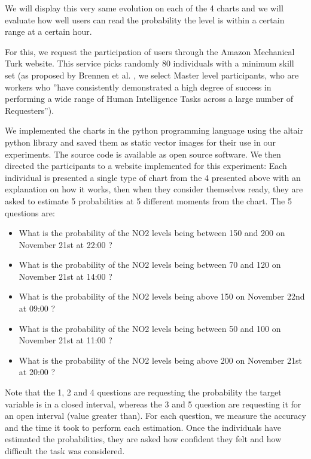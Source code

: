 \documentclass[a4paper,3p,sort&compress]{elsarticle}
\begin{document}
We will display this very same evolution on each of the 4 charts and we will evaluate how well users can 
read the probability the \no level is within a certain range at a certain hour. 

For this, we request the participation of users through the Amazon Mechanical Turk website. 
This service picks randomly 80 individuals with a minimum skill set (as proposed by Brennen 
et al. \cite{brennen_instrument_2018}, we select Master level participants, who are workers who 
''have consistently demonstrated a high degree of success in performing a wide range of Human Intelligence Tasks across a 
large number of Requesters'').

We implemented the charts in the python programming language using the altair python library 
\cite{vanderplas2018altair} and saved them as static vector images for their use in our experiments. The source code is 
available as open source software. We then directed the participants to a website implemented for this experiment: 
Each individual is presented a 
single type of chart from the 4 presented above with an explanation on how it works, 
then when they consider themselves ready, they are asked to estimate 5 probabilities at 5 different moments from the chart. 
The 5 questions are:
\begin{itemize}
  \item What is the probability of the NO2 levels being between 150 and 200 on November 21st at 22:00 ?
  \item What is the probability of the NO2 levels being between 70 and 120 on November 21st at 14:00 ?
  \item What is the probability of the NO2 levels being above 150 on November 22nd at 09:00 ?
  \item What is the probability of the NO2 levels being between 50 and 100 on November 21st at 11:00 ?
  \item What is the probability of the NO2 levels being above 200 on November 21st at 20:00 ?
\end{itemize}

Note that the 1, 2 and 4 questions are requesting the probability the target variable is in a closed interval, whereas
the 3 and 5 question are requesting it for an open interval (value greater than). 
For each question, we measure the accuracy and the time it took to 
perform each estimation. Once the individuals have estimated the probabilities, they are asked how confident they 
felt and how difficult the task was considered.
\end{document}
